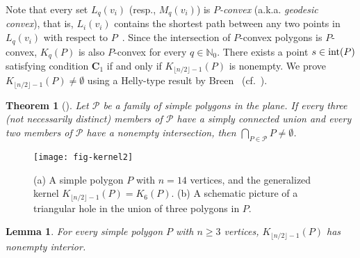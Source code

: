 \documentclass[12pt]{article}
\newcommand{\floor}[1]{{\lfloor #1 \rfloor}}
\newtheorem{lemma}{Lemma}
\newtheorem{theorem}{Theorem}
\begin{document}
Note that every set $L_q(v_i)$ (resp., $M_q(v_i)$) is \emph{$P$-convex} (a.k.a.  \emph{geodesic convex}),
that is, $L_i(v_i)$ contains the shortest path between any two points in $L_q(v_i)$ with respect to $P$~\cite{BKOW14,DEH04,Tou86}. Since the intersection of $P$-convex polygons is $P$-convex, $K_q(P)$ is also $P$-convex for every $q\in \mathbb{N}_0$.
There exists a point $s\in {\rm int}(P)$ satisfying condition $\mathbf{C}_1$ if and only if $K_{\floor{n/2}-1}(P)$ is nonempty. We prove $K_{\floor{n/2}-1}(P)\neq \emptyset$ using a Helly-type result by Breen~\cite{Breen} (cf.~\cite{Breen98,Molnar57}).

\begin{theorem}[\cite{Breen}]\label{thm:Breen}
Let $\mathcal{P}$ be a family of simple polygons in the plane. If every three (not necessarily distinct)
members of $\mathcal{P}$ have a simply connected union and every two members of $\mathcal{P}$
have a nonempty intersection, then $\bigcap_{P \in \mathcal{P}}{P} \neq \emptyset$.
\end{theorem}
\begin{figure}[htp]
  \centering
  \texttt{[image: fig-kernel2]}
  \caption{\label{fig:kernel2}
(a) A simple polygon $P$ with $n=14$ vertices, and the generalized kernel $K_{\floor{n/2}-1}(P)=K_6(P)$.
(b) A schematic picture of a triangular hole in the union of three polygons in $P$.}
\end{figure}
\begin{lemma}\label{lem:kernel}
  For every simple polygon $P$ with $n\geq 3$ vertices, $K_{\floor{n/2}-1}(P)$ has nonempty interior.
\end{lemma}
\end{document}
